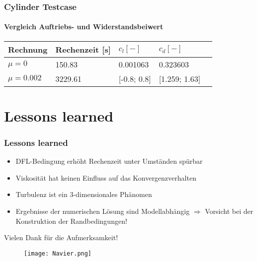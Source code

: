 \documentclass[
	11pt, %
	aspectratio=169, %
]{beamer}
\begin{document}
\begin{frame}
	\frametitle{Cylinder Testcase}
	\framesubtitle{Vergleich Auftriebs- und Widerstandsbeiwert}

	\begin{table}
		\begin{tabular}{l l l l l}
			\toprule
			Rechnung & Rechenzeit [s]& $c_l [-]$  & $c_d [-]$\\
			\midrule
			$\mu = 0$ & 150.83 & 0.001063 & 0.323603\\
			$\mu = 0.002$& 3229.61 & [-0.8; 0.8] & [1.259; 1.63]\\
			\bottomrule
		\end{tabular}
	\end{table}
\end{frame}





 \section{Lessons learned}

 \begin{frame}
 	\frametitle{Lessons learned}

	\begin{itemize}
		\item DFL-Bedingung erhöht Rechenzeit unter Umständen spürbar
		\item Viskosität hat keinen Einfluss auf das Konvergenzverhalten
		\item Turbulenz ist ein 3-dimensionales Phänomen
		\item Ergebnisse der numerischen Lösung sind Modellabhängig $\Rightarrow$ Vorsicht bei der Konstruktion der Randbedingungen! 
	\end{itemize}

 \end{frame}



\begin{frame} %
	 	\begin{center}
		
		\bigskip \bigskip %
		
		{\Large Vielen Dank für die Aufmerksamkeit!}
		\begin{figure}
			\texttt{[image: Navier.png]}
		\end{figure}
	\end{center}
 \end{frame}
\end{document}
